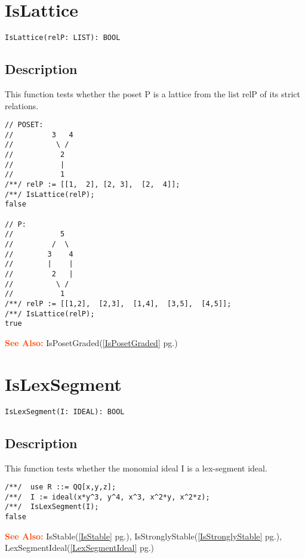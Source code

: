 \documentclass[a4paper]{mybook}
\newenvironment{command}{}{} %
\newcommand\SeeAlso{\par\textcolor{OrangeRed}{\textbf{\large See Also: }}}
\begin{document}
\section{IsLattice}
\label{IsLattice}
\begin{command} %


\begin{Verbatim}[label=syntax, rulecolor=\color{MidnightBlue},
frame=single]
IsLattice(relP: LIST): BOOL 
\end{Verbatim}


\subsection*{Description}

This function tests whether the poset P is a lattice from the list relP of its strict relations.
\begin{Verbatim}[label=example, rulecolor=\color{PineGreen}, frame=single]
// POSET:
//         3   4
//          \ /
//           2
//           |
//           1
/**/ relP := [[1,  2], [2, 3],  [2,  4]];    
/**/ IsLattice(relP);
false
    
// P:
//           5
//         /  \   
//        3    4
//        |    |
//         2   |
//          \ /
//           1
/**/ relP := [[1,2],  [2,3],  [1,4],  [3,5],  [4,5]];
/**/ IsLattice(relP);
true
\end{Verbatim}


\SeeAlso %
  IsPosetGraded(\ref{IsPosetGraded} pg.\pageref{IsPosetGraded})
\end{command} %

\section{IsLexSegment}
\label{IsLexSegment}
\begin{command} %


\begin{Verbatim}[label=syntax, rulecolor=\color{MidnightBlue},
frame=single]
IsLexSegment(I: IDEAL): BOOL
\end{Verbatim}


\subsection*{Description}

This function tests whether the monomial ideal I is a lex-segment ideal.
\begin{Verbatim}[label=example, rulecolor=\color{PineGreen}, frame=single]
/**/  use R ::= QQ[x,y,z];
/**/  I := ideal(x*y^3, y^4, x^3, x^2*y, x^2*z);
/**/  IsLexSegment(I);
false
\end{Verbatim}


\SeeAlso %
  IsStable(\ref{IsStable} pg.\pageref{IsStable}), 
    IsStronglyStable(\ref{IsStronglyStable} pg.\pageref{IsStronglyStable}), 
    LexSegmentIdeal(\ref{LexSegmentIdeal} pg.\pageref{LexSegmentIdeal})
\end{command} %
\end{document}
